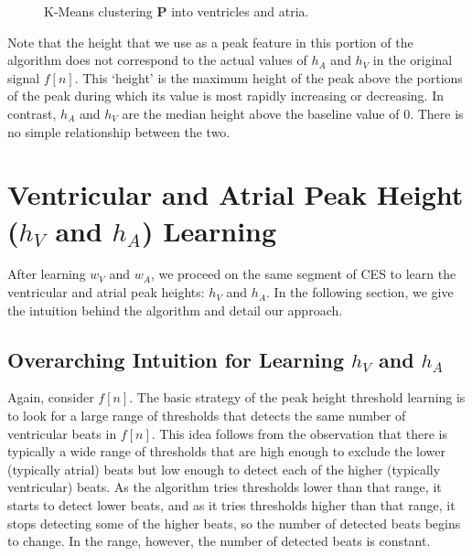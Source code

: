 \documentclass[conference]{IEEEtran}
\newcommand{\APW}{\ensuremath{w_A}}
\newcommand{\VPW}{\ensuremath{w_V}}
\newcommand{\APH}{\ensuremath{h_A}}
\newcommand{\VPH}{\ensuremath{h_V}}
\begin{document}
\begin{figure}
	\centering
	\caption{
	K-Means clustering $\mathbf{P}$ into ventricles and atria.}
		\label{fig:kmeans}
\end{figure}

Note that the height that we use as a peak feature in
this portion of the algorithm does not correspond to the
actual values of \APH{} and \VPH{} in the original signal
$f[n]$. This `height' is the maximum height of the peak
above the portions of the peak during which its
value is most rapidly increasing or decreasing. 
In contrast, \APH{} and \VPH{} are the median height above the baseline value of 0.
There is no simple relationship between the two.

\section{Ventricular and Atrial Peak Height (\VPH{} and \APH{}) Learning}
After learning \VPW{} and \APW{}, we proceed on the
same segment of CES to learn the ventricular and atrial peak heights: \VPH{} and \APH{}. In
the following section, we give the intuition behind the
algorithm and detail our approach.

\subsection{Overarching Intuition for Learning \VPH{} and \APH{}}
Again, consider $f[n]$. The basic strategy of the peak
height threshold learning is to look for a large range of
thresholds that detects the same number of ventricular beats in
$f[n]$. This idea follows from the observation that there
is typically a wide range of thresholds that are high
enough to exclude the lower (typically atrial) beats but
low enough to detect each of the higher (typically
ventricular) beats. As the algorithm tries thresholds
lower than that range, it starts to detect lower beats, and
as it tries thresholds higher than that range, it stops
detecting some of the higher beats, so the number of
detected beats begins to change. In the range, however,
the number of detected beats is constant.
\end{document}
